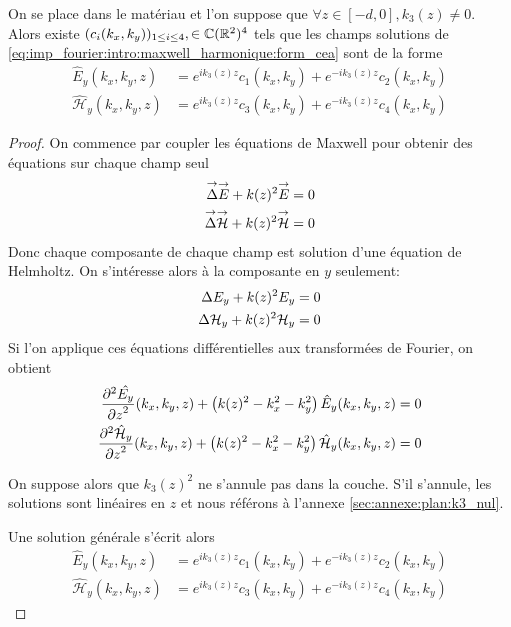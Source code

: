     \begin{prop}
        On se place dans le matériau et l’on suppose que \(\forall z \in [-d,0], k_3(z) \not = 0\).
        Alors existe \((c_i(k_x,k_y))_{1\le i \le4}, \in \CC(\RR^2)^4\) tels que les champs solutions de \ref{eq:imp_fourier:intro:maxwell_harmonique:form_cea} sont de la forme
        \begin{align*}
            \hat{E}_y(k_x,k_y,z) & = e^{ik_3(z)z}c_1(k_x,k_y) + e^{-ik_3(z)z}c_2(k_x,k_y)
            \\
            \hat{\mathcal{H}}_y(k_x,k_y,z) & = e^{ik_3(z)z}c_3(k_x,k_y) + e^{-ik_3(z)z}c_4(k_x,k_y)
        \end{align*}
    \end{prop}

    \begin{proof}
      On commence par coupler les équations de Maxwell pour obtenir des équations sur chaque champ seul
      \begin{align*}
          \vlapl{\vE} + k(z)^2 \vE & = 0
          \\
          \vlapl{\vH} + k(z)^2 \vH & = 0
      \end{align*}
      Donc chaque composante de chaque champ est solution d'une équation de Helmholtz. On s’intéresse alors à la composante en \(y\) seulement:
      \begin{align*}
          \lapl{E_y} + k(z)^2 E_y & = 0
          \\
          \lapl{\mathcal{H}_y} + k(z)^2 \mathcal{H}_y & = 0
      \end{align*}
      Si l'on applique ces équations différentielles aux transformées de Fourier, on obtient
      \begin{align*}
          \ddr[2]{z}{\hat{E_y}}(k_x,k_y,z) + \left( k(z)^2 - k_x^2 - k_y^2\right) \hat{E}_y(k_x,k_y,z) & = 0
          \\
          \ddr[2]{z}{\hat{\mathcal{H}}_y}(k_x,k_y,z) + \left( k(z)^2 - k_x^2 - k_y^2\right) \hat{\mathcal{H}}_y(k_x,k_y,z) & = 0
      \end{align*}

      On suppose alors que \(k_3(z)^2\) ne s'annule pas dans la couche. S'il s'annule, les solutions sont linéaires en \(z\) et nous référons à l'annexe \ref{sec:annexe:plan:k3_nul}.

      Une solution générale s'écrit alors
      \begin{align*}
          \hat{E}_y(k_x,k_y,z) & = e^{ik_3(z)z}c_1(k_x,k_y) + e^{-ik_3(z)z}c_2(k_x,k_y)
          \\
          \hat{\mathcal{H}}_y(k_x,k_y,z) & = e^{ik_3(z)z}c_3(k_x,k_y) + e^{-ik_3(z)z}c_4(k_x,k_y)
      \end{align*}
    \end{proof}

